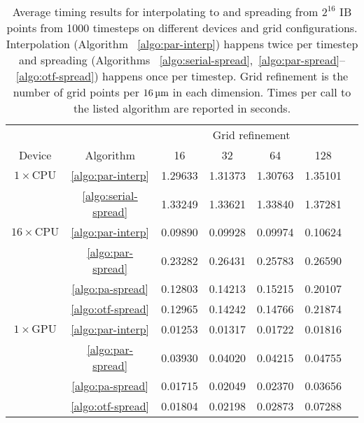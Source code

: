 \begin{table*}[ht]
    \caption{%
Average timing results for interpolating to and spreading from $2^{16}$ IB points from
1000 timesteps on different devices and grid configurations. Interpolation (Algorithm~%
\ref{algo:par-interp}) happens twice per timestep and spreading (Algorithms~%
\ref{algo:serial-spread},~\ref{algo:par-spread}--\ref{algo:otf-spread}) happens once per
timestep. Grid refinement is the number of grid points per $16\um$ in each dimension.
Times per call to the listed algorithm are reported in seconds.
    }\label{tab:grid-timing}
    \begin{center}
    \bgroup
    \renewcommand{\arraystretch}{1.7}
    \begin{tabular}{ccccccc}
                                                                                              \toprule
                             &                          & \multicolumn{4}{c}{Grid refinement}   \\ \cline{3-6}
        Device               & Algorithm                & 16      & 32      & 64      & 128     \\ \midrule
        $1\times\text{CPU}$  & \ref{algo:par-interp}    & 1.29633 & 1.31373 & 1.30763 & 1.35101 \\
                             & \ref{algo:serial-spread} & 1.33249 & 1.33621 & 1.33840 & 1.37281 \\ \midrule
        $16\times\text{CPU}$ & \ref{algo:par-interp}    & 0.09890 & 0.09928 & 0.09974 & 0.10624 \\
                             & \ref{algo:par-spread}    & 0.23282 & 0.26431 & 0.25783 & 0.26590 \\
                             & \ref{algo:pa-spread}     & 0.12803 & 0.14213 & 0.15215 & 0.20107 \\
                             & \ref{algo:otf-spread}    & 0.12965 & 0.14242 & 0.14766 & 0.21874 \\ \midrule
        $1\times\text{GPU}$  & \ref{algo:par-interp}    & 0.01253 & 0.01317 & 0.01722 & 0.01816 \\
                             & \ref{algo:par-spread}    & 0.03930 & 0.04020 & 0.04215 & 0.04755 \\
                             & \ref{algo:pa-spread}     & 0.01715 & 0.02049 & 0.02370 & 0.03656 \\
                             & \ref{algo:otf-spread}    & 0.01804 & 0.02198 & 0.02873 & 0.07288 \\ \bottomrule
    \end{tabular}
    \egroup
    \end{center}
\end{table*}

